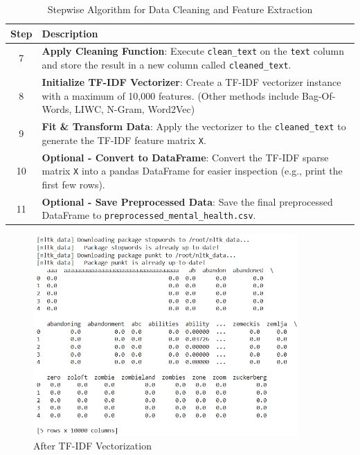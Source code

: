 \begin{table}[H]
    \caption*{Stepwise Algorithm for Data Cleaning and Feature Extraction}
    \label{tab:algorithm}
    \centering
    \begin{tabularx}{\textwidth}{|c|X|}
    \hline
    \textbf{Step} & \textbf{Description} \\
    \hline
    7 & \textbf{Apply Cleaning Function}: Execute \texttt{clean\_text} on the \texttt{text} column and store the result in a new column called \texttt{cleaned\_text}. \\
    \hline
    8 & \textbf{Initialize TF-IDF Vectorizer}: Create a TF-IDF vectorizer instance with a maximum of 10,000 features. (Other methods include Bag-Of-Words, LIWC, N-Gram, Word2Vec)\\
    \hline
    9 & \textbf{Fit \& Transform Data}: Apply the vectorizer to the \texttt{cleaned\_text} to generate the TF-IDF feature matrix \texttt{X}. \\
    \hline
    10 & \textbf{Optional - Convert to DataFrame}: Convert the TF-IDF sparse matrix \texttt{X} into a pandas DataFrame for easier inspection (e.g., print the first few rows). \\
    \hline
    11 & \textbf{Optional - Save Preprocessed Data}: Save the final preprocessed DataFrame to \texttt{preprocessed\_mental\_health.csv}. \\
    \hline
    \end{tabularx}
\end{table}

\begin{figure}[h!]  
    \centering
    \includegraphics[width=0.9\textwidth]{Images/Data Cleaning and Preprocessing.png}  
    \caption*{After TF-IDF Vectorization}
    \label{Data Collection and Preprocessing}  %
\end{figure}

